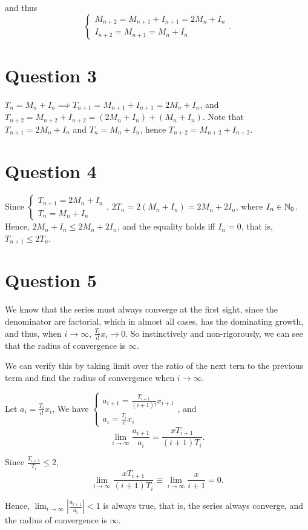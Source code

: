 \documentclass[12pt,a4paper]{article}
\begin{document}
and thus 
\begin{equation}
    \begin{cases}
        M_{n+2} = M_{n+1} + I_{n+1} = 2M_n + I_n\\
        I_{n+2} = M_{n+1} = M_n + I_n
    \end{cases}.
\end{equation}

\section*{Question 3}
\begin{solution}
$T_n = M_n + I_n \implies T_{n+1} = M_{n+1} + I_{n+1}= 2M_n+I_n$, and $T_{n+2} = M_{n+2} + I_{n+2}= (2M_n+I_n) + (M_n + I_n)$. Note that $T_{n+1} = 2M_n+I_n$ and $T_n = M_n + I_n$, hence $T_{n+2} = M_{n+2} + I_{n+2}$.
\end{solution}

\section*{Question 4}
\begin{solution}
    Since 
    $\begin{cases}
        T_{n+1} = 2M_n+I_n\\
        T_n = M_n + I_n
    \end{cases}$,
    $2T_n = 2(M_n + I_n) = 2M_n + 2 I_n$, where $I_n \in \mathbb{N}_0$. Hence, $2M_n+I_n \leq 2M_n + 2 I_n$, and the equality holds iff $I_n = 0$, that is, $T_{n+1}\leq2T_n$.
\end{solution}
\section*{Question 5}
\begin{solution}
We know that the series must always converge at the first sight, since the denominator are factorial, which in almost all cases, has the dominating growth, and thus, when $i \to \infty$, $\frac{T_i}{i!}x_i \to 0$. So instinctively and non-rigorously, we can see that the radius of convergence is $\infty$.

We can verify this by taking limit over the ratio of the next tern to the previous term and find the radius of convergence when $i\to\infty$.

Let $a_i = \frac{T_i}{i!}x_i$,
We have 
$\begin{cases}
a_{i+1} = \frac{T_{i+1}}{(i+1)!}x_{i+1}\\
a_i = \frac{T_i}{i!}x_i
\end{cases}$, and 
\[
\lim_{i \to \infty} \frac{a_{i+1}}{a_i} = \frac{xT_{i+1}}{(i+1)T_i}.
\]

Since $\frac{T_{i+1}}{T_i}\leq2$,
\[
\lim_{i \to \infty} \frac{xT_{i+1}}{(i+1)T_i} \equiv \lim_{i \to \infty} \frac{x}{i+1} = 0.
\]

Hence, $\lim_{i \to \infty} \left|\frac{a_{i+1}}{a_i}\right| < 1$ is always true, that is, the series always converge, and the radius of convergence is $\infty$.
\end{solution}
\end{document}
